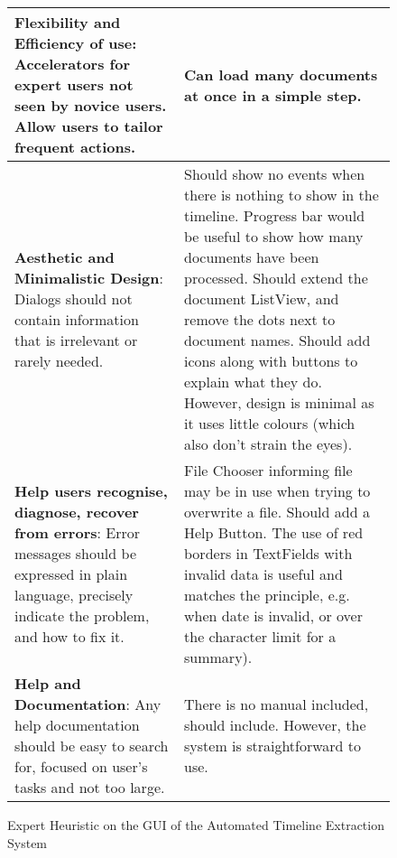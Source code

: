 \begin{figure}[h]
\begin{tabular}{|p{6cm}|p{8cm}|}
\hline
\textbf{Flexibility and Efficiency of use}: Accelerators for expert users not seen by novice users. Allow users to tailor frequent actions. & Can load many documents at once in a simple step.\\
\hline
\textbf{Aesthetic and Minimalistic Design}: Dialogs should not contain information that is irrelevant or rarely needed. & Should show no events when there is nothing to show in the timeline. Progress bar would be useful to show how many documents have been processed. Should extend the document ListView, and remove the dots next to document names. Should add icons along with buttons to explain what they do. However, design is minimal as it uses little colours (which also don't strain the eyes).\\
\hline
\textbf{Help users recognise, diagnose, recover from errors}: Error messages should be expressed in plain language, precisely indicate the problem, and how to fix it. & File Chooser informing file may be in use when trying to overwrite a file. Should add a Help Button. The use of red borders in TextFields with invalid data is useful and matches the principle, e.g. when date is invalid, or over the character limit for a summary).\\
\hline
\textbf{Help and Documentation}: Any help documentation should be easy to search for, focused on user’s tasks and not too large. & There is no manual included, should include. However, the system is straightforward to use.\\
\hline
\end{tabular}
\caption{Expert Heuristic on the GUI of the Automated Timeline Extraction System}
\label{fig:expertHer}
\end{figure}


